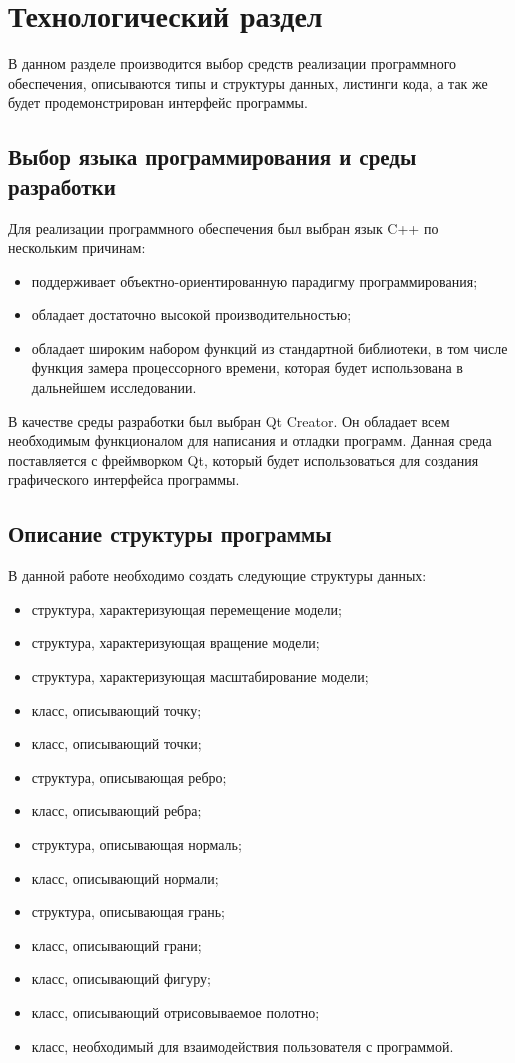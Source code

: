 \chapter{Технологический раздел}
В данном разделе производится выбор средств реализации программного обеспечения, описываются типы и структуры данных, листинги кода, а так же будет продемонстрирован интерфейс программы.

\section{Выбор языка программирования и среды разработки}

Для реализации программного обеспечения был выбран язык C++ по нескольким причинам:
\begin{itemize}
	\item поддерживает объектно-ориентированную парадигму программирования;
	\item обладает достаточно высокой производительностью;
	\item обладает широким набором функций из стандартной библиотеки, в том числе функция замера процессорного времени, которая будет использована в дальнейшем исследовании.
\end{itemize}

В качестве среды разработки был выбран Qt Creator. Он обладает всем необходимым функционалом для написания и отладки программ. Данная среда поставляется с фреймворком Qt, который будет использоваться для создания графического интерфейса программы.


\section{Описание структуры программы}
В данной работе необходимо создать следующие структуры данных:

\begin{itemize}
	\item структура, характеризующая перемещение модели;
	\item структура, характеризующая вращение модели;
	\item структура, характеризующая масштабирование модели;
	\item класс, описывающий точку;
	\item класс, описывающий точки;
	\item структура, описывающая ребро;
	\item класс, описывающий ребра;
	\item структура, описывающая нормаль;
	\item класс, описывающий нормали;
	\item структура, описывающая грань;
	\item класс, описывающий грани;
	\item класс, описывающий фигуру;
	\item класс, описывающий отрисовываемое полотно;
	\item класс, необходимый для взаимодействия пользователя с программой.
\end{itemize}


